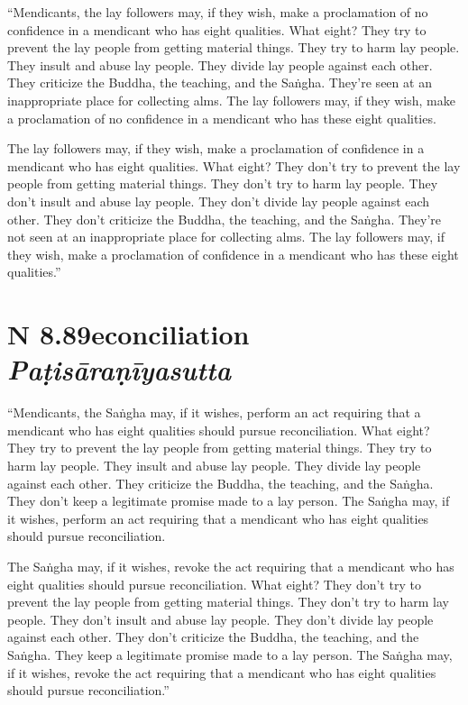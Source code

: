 \documentclass[12pt,openany]{book}%
\newcommand*{\suttatitleacronym}[1]{\smaller[2]{#1}\vspace*{.3em}}
\newcommand*{\suttatitletranslation}[1]{\linebreak{#1}}
\newcommand*{\suttatitleroot}[1]{\linebreak\smaller[2]\itshape{#1}}
\newcommand*{\tocacronym}[1]{\hspace*{-3.3em}{#1}\quad}
\newcommand*{\toctranslation}[1]{#1}
\newcommand*{\tocroot}[1]{(\textit{#1})}
\begin{document}
“Mendicants, the lay followers may, if they wish, make a proclamation of no confidence in a mendicant who has eight qualities. What eight? They try to prevent the lay people from getting material things. They try to harm lay people. They insult and abuse lay people. They divide lay people against each other. They criticize the Buddha, the teaching, and the \textsanskrit{Saṅgha}. They’re seen at an inappropriate place for collecting alms. The lay followers may, if they wish, make a proclamation of no confidence in a mendicant who has these eight qualities. 

The lay followers may, if they wish, make a proclamation of confidence in a mendicant who has eight qualities. What eight? They don’t try to prevent the lay people from getting material things. They don’t try to harm lay people. They don’t insult and abuse lay people. They don’t divide lay people against each other. They don’t criticize the Buddha, the teaching, and the \textsanskrit{Saṅgha}. They’re not seen at an inappropriate place for collecting alms. The lay followers may, if they wish, make a proclamation of confidence in a mendicant who has these eight qualities.” 

%
\section*{{\suttatitleacronym AN 8.89}{\suttatitletranslation Reconciliation }{\suttatitleroot Paṭisāraṇīyasutta}}
\addcontentsline{toc}{section}{\tocacronym{AN 8.89} \toctranslation{Reconciliation } \tocroot{Paṭisāraṇīyasutta}}

“Mendicants, the \textsanskrit{Saṅgha} may, if it wishes, perform an act requiring that a mendicant who has eight qualities should pursue reconciliation. What eight? They try to prevent the lay people from getting material things. They try to harm lay people. They insult and abuse lay people. They divide lay people against each other. They criticize the Buddha, the teaching, and the \textsanskrit{Saṅgha}. They don’t keep a legitimate promise made to a lay person. The \textsanskrit{Saṅgha} may, if it wishes, perform an act requiring that a mendicant who has eight qualities should pursue reconciliation. 

The \textsanskrit{Saṅgha} may, if it wishes, revoke the act requiring that a mendicant who has eight qualities should pursue reconciliation. What eight? They don’t try to prevent the lay people from getting material things. They don’t try to harm lay people. They don’t insult and abuse lay people. They don’t divide lay people against each other. They don’t criticize the Buddha, the teaching, and the \textsanskrit{Saṅgha}. They keep a legitimate promise made to a lay person. The \textsanskrit{Saṅgha} may, if it wishes, revoke the act requiring that a mendicant who has eight qualities should pursue reconciliation.” 
\end{document}

